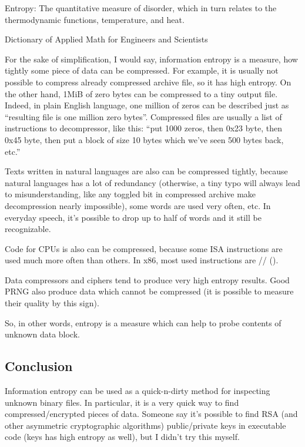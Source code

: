 \label{entropy}

\epigraph{Entropy: The quantitative measure of disorder, which in turn relates to the thermodynamic functions, temperature, and heat.}
{Dictionary of Applied Math for Engineers and Scientists}

For the sake of simplification, I would say, information entropy is a measure,
how tightly some piece of data can be compressed.
For example, it is usually not possible to compress already compressed archive file, so it has high entropy.
On the other hand, 1MiB of zero bytes can be compressed to a tiny output file.
Indeed, in plain English language, one million of zeros can be described just as
``resulting file is one million zero bytes''.
Compressed files are usually a list of instructions to decompressor, like this:
``put 1000 zeros, then 0x23 byte, then 0x45 byte, then put a block of size 10 bytes which we've seen 500 bytes back, etc.''

Texts written in natural languages are also can be compressed tightly, 
because natural languages has a lot of redundancy
(otherwise, a tiny typo will always lead to misunderstanding, 
like any toggled bit in compressed archive make decompression nearly impossible), 
some words are used very often, etc.
In everyday speech, it's possible to drop up to half of words and it still be recognizable.

Code for CPUs is also can be compressed, because some \ac{ISA} instructions are used much more often than others.
In x86, most used instructions are // ().

Data compressors and ciphers tend to produce very high entropy results.
Good \ac{PRNG} also produce data which cannot be compressed 
(it is possible to measure their quality by this sign).

So, in other words, entropy is a measure which can help to probe contents of unknown data block.



\subsection{Conclusion}

Information entropy can be used as a quick-n-dirty method for inspecting unknown binary files.
In particular, it is a very quick way to find compressed/encrypted pieces of data.
Someone say it's possible to find \ac{RSA} (and other asymmetric cryptographic algorithms) public/private keys 
in executable code (keys has high entropy as well), but I didn't try this myself.

